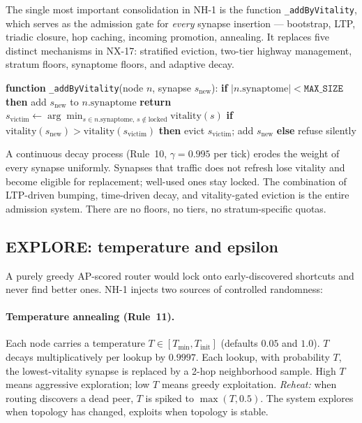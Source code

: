 \documentclass[conference]{IEEEtran}
\newcommand{\nhone}{NH-1\xspace}
\newcommand{\NXseventeen}{NX-17\xspace}
\begin{document}
The single most important consolidation in \nhone is the function
\texttt{\_addByVitality}, which serves as the admission gate for
\emph{every} synapse insertion --- bootstrap, LTP, triadic closure,
hop caching, incoming promotion, annealing. It replaces five distinct
mechanisms in \NXseventeen: stratified eviction, two-tier highway
management, stratum floors, synaptome floors, and adaptive decay.

\begin{algorithmic}
\STATE \textbf{function} \texttt{\_addByVitality}(node $n$, synapse $s_{\mathrm{new}}$):
\STATE \quad \textbf{if} $|n.\mathrm{synaptome}| < \texttt{MAX\_SIZE}$ \textbf{then}
\STATE \quad \quad add $s_{\mathrm{new}}$ to $n.\mathrm{synaptome}$
\STATE \quad \quad \textbf{return}
\STATE \quad $s_{\mathrm{victim}} \leftarrow \arg\min_{s \in n.\mathrm{synaptome},\, s \notin \mathrm{locked}} \mathrm{vitality}(s)$
\STATE \quad \textbf{if} $\mathrm{vitality}(s_{\mathrm{new}}) > \mathrm{vitality}(s_{\mathrm{victim}})$ \textbf{then}
\STATE \quad \quad evict $s_{\mathrm{victim}}$; add $s_{\mathrm{new}}$
\STATE \quad \textbf{else}
\STATE \quad \quad refuse silently
\end{algorithmic}

\noindent
A continuous decay process (Rule~10, $\gamma = 0.995$ per tick) erodes the
weight of every synapse uniformly. Synapses that traffic does not refresh
lose vitality and become eligible for replacement; well-used ones stay
locked. The combination of LTP-driven bumping, time-driven decay, and
vitality-gated eviction is the entire admission system. There are no
floors, no tiers, no stratum-specific quotas.

\subsection{EXPLORE: temperature and epsilon}
\label{sec:nh1-explore}

A purely greedy AP-scored router would lock onto early-discovered
shortcuts and never find better ones. \nhone injects two sources of
controlled randomness:

\paragraph{Temperature annealing (Rule~11).}
Each node carries a temperature $T \in [T_{\min}, T_{\mathrm{init}}]$
(defaults $0.05$ and $1.0$). $T$ decays multiplicatively per lookup by
$0.9997$. Each lookup, with probability $T$, the lowest-vitality
synapse is replaced by a 2-hop neighborhood sample. High $T$ means
aggressive exploration; low $T$ means greedy exploitation. \emph{Reheat:}
when routing discovers a dead peer, $T$ is spiked to
$\max(T, 0.5)$. The system explores when topology has changed, exploits
when topology is stable.
\end{document}
